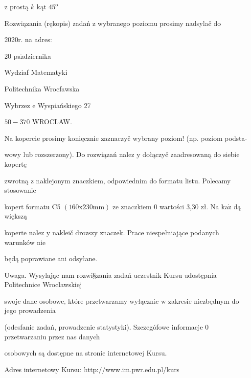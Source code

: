 \documentclass[a4paper,12pt]{article}
\begin{document}
$\mathrm{z}$ prostą $k$ kąt $45^{\mathrm{o}}$

Rozwiązania (rękopis) zadań z wybranego poziomu prosimy nadsylač do

2020r. na adres:

20 $\mathrm{p}\mathrm{a}\acute{\mathrm{z}}$dziernika

Wydziaf Matematyki

Politechnika Wrocfawska

Wybrzez $\mathrm{e}$ Wyspiańskiego 27

$50-370$ WROCLAW.

Na kopercie prosimy $\underline{\mathrm{k}\mathrm{o}\mathrm{n}\mathrm{i}\mathrm{e}\mathrm{c}\mathrm{z}\mathrm{n}\mathrm{i}\mathrm{e}}$ zaznaczyč wybrany poziom! (np. poziom podsta-

wowy lub rozszerzony). Do rozwiązań nalez $\mathrm{y}$ dołączyč zaadresowaną do siebie kopertę

zwrotną $\mathrm{z}$ naklejonym znaczkiem, odpowiednim do formatu listu. Polecamy stosowanie

kopert formatu C5 $(160\mathrm{x}230\mathrm{m}\mathrm{m})$ ze znaczkiem $0$ wartości 3,30 zł. Na $\mathrm{k}\mathrm{a}\dot{\mathrm{z}}$ dą większą

koperte nalez $\mathrm{y}$ nakleič drozszy znaczek. Prace niespełniające podanych warunków nie

będą poprawiane ani odsyłane.

Uwaga. Wysylając nam rozwi\S zania zadań uczestnik Kursu udostępnia Politechnice Wroclawskiej

swoje dane osobowe, które przetwarzamy wyłącznie $\mathrm{w}$ zakresie niezbędnym do jego prowadzenia

(odesfanie zadań, prowadzenie statystyki). Szczegófowe informacje $0$ przetwarzaniu przez nas danych

osobowych są dostępne na stronie internetowej Kursu.

Adres internetowy Kursu: http://www.im.pwr.edu.pl/kurs
\end{document}
